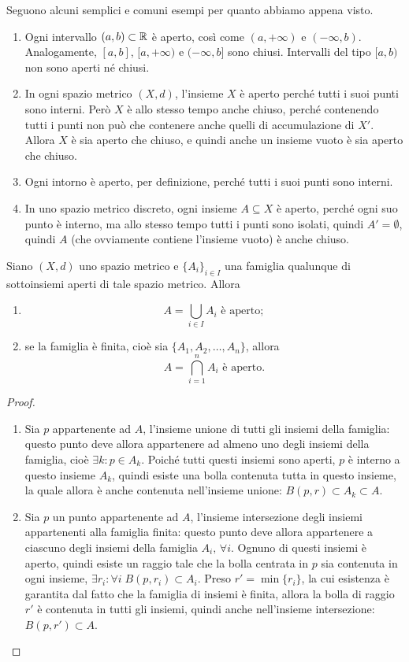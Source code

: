 \begin{esempio} \label{es:aperti-chiusi}
	Seguono alcuni semplici e comuni esempi per quanto abbiamo appena visto.
	\begin{enumerate}
		\item Ogni intervallo $(a,b)\subset\mathbb{R}$ è aperto, così come $(a,+\infty)$ e $(-\infty,b)$. Analogamente, $[a,b]$, $[a,+\infty)$ e $(-\infty,b]$ sono chiusi. Intervalli del tipo $[a,b)$ non sono aperti né chiusi.
		\item In ogni spazio metrico $(X,d)$, l'insieme $X$ è aperto perché tutti i suoi punti sono interni. Però $X$ è allo stesso tempo anche chiuso, perché contenendo tutti i punti non può che contenere anche quelli di accumulazione di $X'$. Allora $X$ è sia aperto che chiuso, e quindi anche un insieme vuoto è sia aperto che chiuso. 
		\item Ogni intorno è aperto, per definizione, perché tutti i suoi punti sono interni.
		\item In uno spazio metrico discreto, ogni insieme $A\subseteq X$ è aperto, perché ogni suo punto è interno, ma allo stesso tempo tutti i punti sono isolati, quindi $A'=\emptyset$, quindi $A$ (che ovviamente contiene l'insieme vuoto) è anche chiuso.
	\end{enumerate}
\end{esempio}
\begin{teorema} \label{t:unione-intersezione-aperti}
Siano $(X,d)$ uno spazio metrico e $\{A_i\}_{i\in I}$ una famiglia qualunque di sottoinsiemi aperti di tale spazio metrico. Allora
\begin{enumerate}
\item\[
A=\bigcup_{i\in I} A_i\text{ è aperto};
\]
\item se la famiglia è finita, cioè sia $\{A_1,A_2,\dots,A_n\}$, allora
\[
A=\bigcap_{i=1}^n A_i\text{ è aperto}.
\]
\end{enumerate}
\end{teorema}
\begin{proof}
\begin{enumerate}
\item Sia $p$ appartenente ad $A$, l'insieme unione di tutti gli insiemi della famiglia: questo punto deve allora appartenere ad almeno uno degli insiemi della famiglia, cioè $\exists k\colon p\in A_k$. Poiché tutti questi insiemi sono aperti, $p$ è interno a questo insieme $A_k$, quindi esiste una bolla contenuta tutta in questo insieme, la quale allora è anche contenuta nell'insieme unione: $B(p,r)\subset A_k\subset A$.
\item Sia $p$ un punto appartenente ad $A$, l'insieme intersezione degli insiemi appartenenti alla famiglia finita: questo punto deve allora appartenere a ciascuno degli insiemi della famiglia $A_i,\,\forall i$. Ognuno di questi insiemi è aperto, quindi esiste un raggio tale che la bolla centrata in $p$ sia contenuta in ogni insieme, $\exists r_i\colon \forall i\;B(p,r_i)\subset A_i$. Preso $r'=\min\{r_i\}$, la cui esistenza è garantita dal fatto che la famiglia di insiemi è finita, allora la bolla di raggio $r'$ è contenuta in tutti gli insiemi, quindi anche nell'insieme intersezione: $B(p,r')\subset A$.
\end{enumerate}
\end{proof}

